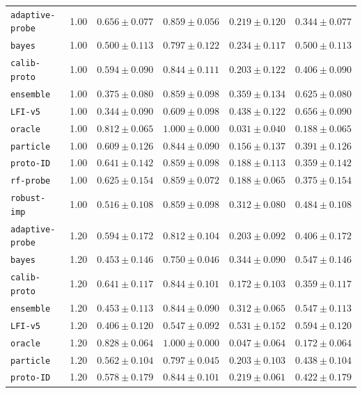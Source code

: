 \documentclass{article}
\begin{document}
\begin{center}
{\begin{tabular}{llcccc}
\texttt{adaptive-probe} & 1.00 & $0.656 \pm 0.077$ & $0.859 \pm 0.056$ & $0.219 \pm 0.120$ & $0.344 \pm 0.077$ \\
\texttt{bayes} & 1.00 & $0.500 \pm 0.113$ & $0.797 \pm 0.122$ & $0.234 \pm 0.117$ & $0.500 \pm 0.113$ \\
\texttt{calib-proto} & 1.00 & $0.594 \pm 0.090$ & $0.844 \pm 0.111$ & $0.203 \pm 0.122$ & $0.406 \pm 0.090$ \\
\texttt{ensemble} & 1.00 & $0.375 \pm 0.080$ & $0.859 \pm 0.098$ & $0.359 \pm 0.134$ & $0.625 \pm 0.080$ \\
\texttt{LFI-v5} & 1.00 & $0.344 \pm 0.090$ & $0.609 \pm 0.098$ & $0.438 \pm 0.122$ & $0.656 \pm 0.090$ \\
\texttt{oracle} & 1.00 & $0.812 \pm 0.065$ & $1.000 \pm 0.000$ & $0.031 \pm 0.040$ & $0.188 \pm 0.065$ \\
\texttt{particle} & 1.00 & $0.609 \pm 0.126$ & $0.844 \pm 0.090$ & $0.156 \pm 0.137$ & $0.391 \pm 0.126$ \\
\texttt{proto-ID} & 1.00 & $0.641 \pm 0.142$ & $0.859 \pm 0.098$ & $0.188 \pm 0.113$ & $0.359 \pm 0.142$ \\
\texttt{rf-probe} & 1.00 & $0.625 \pm 0.154$ & $0.859 \pm 0.072$ & $0.188 \pm 0.065$ & $0.375 \pm 0.154$ \\
\texttt{robust-imp} & 1.00 & $0.516 \pm 0.108$ & $0.859 \pm 0.098$ & $0.312 \pm 0.080$ & $0.484 \pm 0.108$ \\
\texttt{adaptive-probe} & 1.20 & $0.594 \pm 0.172$ & $0.812 \pm 0.104$ & $0.203 \pm 0.092$ & $0.406 \pm 0.172$ \\
\texttt{bayes} & 1.20 & $0.453 \pm 0.146$ & $0.750 \pm 0.046$ & $0.344 \pm 0.090$ & $0.547 \pm 0.146$ \\
\texttt{calib-proto} & 1.20 & $0.641 \pm 0.117$ & $0.844 \pm 0.101$ & $0.172 \pm 0.103$ & $0.359 \pm 0.117$ \\
\texttt{ensemble} & 1.20 & $0.453 \pm 0.113$ & $0.844 \pm 0.090$ & $0.312 \pm 0.065$ & $0.547 \pm 0.113$ \\
\texttt{LFI-v5} & 1.20 & $0.406 \pm 0.120$ & $0.547 \pm 0.092$ & $0.531 \pm 0.152$ & $0.594 \pm 0.120$ \\
\texttt{oracle} & 1.20 & $0.828 \pm 0.064$ & $1.000 \pm 0.000$ & $0.047 \pm 0.064$ & $0.172 \pm 0.064$ \\
\texttt{particle} & 1.20 & $0.562 \pm 0.104$ & $0.797 \pm 0.045$ & $0.203 \pm 0.103$ & $0.438 \pm 0.104$ \\
\texttt{proto-ID} & 1.20 & $0.578 \pm 0.179$ & $0.844 \pm 0.101$ & $0.219 \pm 0.061$ & $0.422 \pm 0.179$ \\
\bottomrule
\end{tabular}%
}
\end{center}
\end{document}

